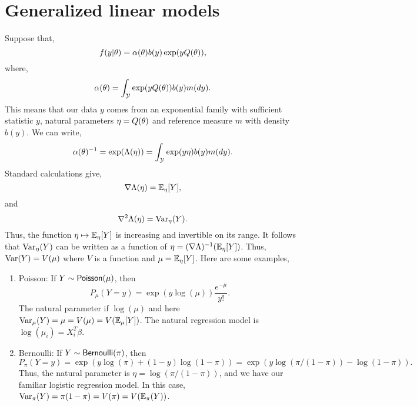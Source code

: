 \section{Generalized linear models}
Suppose that,
\[f(y|{\theta}) = \alpha({\theta})b(y)\exp(yQ({\theta})), \]
where,
\[\alpha({\theta}) = \int_{\mathcal{Y}} \exp(yQ({\theta}))b(y)m(dy). \]
This means that our data $y$ comes from an exponential family with sufficient statistic $y$, natural parameters $\eta = Q({\theta})$ and reference measure $m$ with density $b(y)$. We can write,
\[{\alpha}({\theta})^{-1} = \exp(\Lambda(\eta)) =\int_{\mathcal{Y}} \exp(y\eta)b(y)m(dy). \]
Standard calculations give,
\[\nabla \Lambda(\eta) = {\mathbb{E}}_\eta[Y], \]
and 
\[\nabla^2 \Lambda(\eta) = \operatorname{Var}_\eta(Y). \] 
Thus, the function $\eta \mapsto {\mathbb{E}}_\eta[Y]$ is increasing and invertible on its range. It follows that $\operatorname{Var}_\eta(Y)$ can be written as a function of $\eta = (\nabla \Lambda)^{-1}({\mathbb{E}}_\eta[Y])$. Thus, $\operatorname{Var}(Y) = V(\mu)$ where $V$ is a function and $\mu = {\mathbb{E}}_\eta[Y]$. Here are some examples,
\begin{enumerate}
    \item Poisson: If $Y \sim \mathsf{Poisson}(\mu)$, then \[P_\mu(Y=y)=\exp(y\log(\mu))\frac{e^{-\mu}}{y!}.\]
    The natural parameter if $\log(\mu)$ and here $\operatorname{Var}_\mu(Y)=\mu=V(\mu)=V({\mathbb{E}}_\mu[Y])$. The natural regression model is $\log(\mu_i)=X_i^T\beta$.
    \item Bernoulli: If $Y\sim \mathsf{Bernoulli}(\pi)$, then \[P_{\pi}(Y=y) = \exp(y\log(\pi)+(1-y)\log(1-\pi))=\exp(y\log(\pi/(1-\pi))-\log(1-\pi)).\]
    Thus, the natural parameter is $\eta = \log(\pi/(1-\pi))$, and we have our familiar logistic regression model. In this case, $\operatorname{Var}_\pi(Y)=\pi(1-\pi)=V(\pi)=V({\mathbb{E}}_\pi(Y))$.
\end{enumerate}
